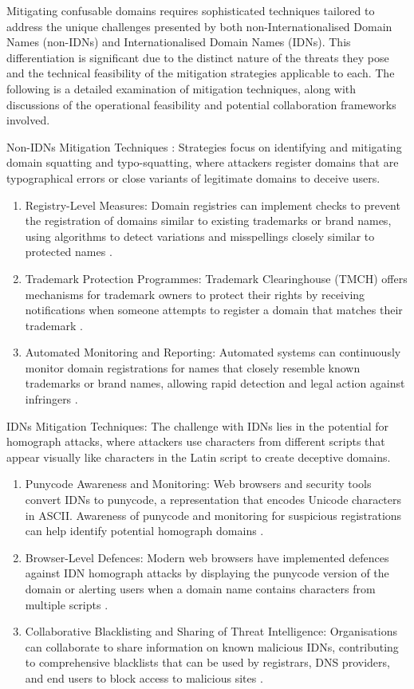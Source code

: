 Mitigating confusable domains requires sophisticated techniques tailored to address the unique challenges presented by both non-Internationalised Domain Names (non-IDNs) and Internationalised Domain Names (IDNs). This differentiation is significant due to the distinct nature of the threats they pose and the technical feasibility of the mitigation strategies applicable to each. The following is a detailed examination of mitigation techniques, along with discussions of the operational feasibility and potential collaboration frameworks involved.

Non-IDNs Mitigation Techniques : Strategies focus on identifying and mitigating domain squatting and typo-squatting, where attackers register domains that are typographical errors or close variants of legitimate domains to deceive users.

\begin{enumerate}
  \item Registry-Level Measures: Domain registries can implement checks to prevent the registration of domains similar to existing trademarks or brand names, using algorithms to detect variations and misspellings closely similar to protected names \cite{WTR2020}.
  \item Trademark Protection Programmes: Trademark Clearinghouse (TMCH) offers mechanisms for trademark owners to protect their rights by receiving notifications when someone attempts to register a domain that matches their trademark \cite{ICANNTMCH}.
  \item Automated Monitoring and Reporting: Automated systems can continuously monitor domain registrations for names that closely resemble known trademarks or brand names, allowing rapid detection and legal action against infringers \cite{TMCH2023}.
\end{enumerate}

IDNs Mitigation Techniques: The challenge with IDNs lies in the potential for homograph attacks, where attackers use characters from different scripts that appear visually like characters in the Latin script to create deceptive domains.

\begin{enumerate}
  \item Punycode Awareness and Monitoring: Web browsers and security tools convert IDNs to punycode, a representation that encodes Unicode characters in ASCII. Awareness of punycode and monitoring for suspicious registrations can help identify potential homograph domains \cite{SOCRadar2023}.
  \item Browser-Level Defences: Modern web browsers have implemented defences against IDN homograph attacks by displaying the punycode version of the domain or alerting users when a domain name contains characters from multiple scripts \cite{Malwarebytes2017}.
  \item Collaborative Blacklisting and Sharing of Threat Intelligence: Organisations can collaborate to share information on known malicious IDNs, contributing to comprehensive blacklists that can be used by registrars, DNS providers, and end users to block access to malicious sites \cite{CyberThreatAlliance2023}.
  
\end{enumerate}


